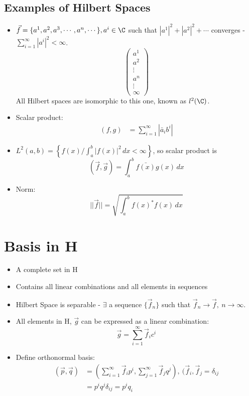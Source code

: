\documentclass[cplx.tex]{subfiles}
\begin{document}
\subsection{Examples of Hilbert Spaces}
\begin{itemize}
    \item $\vec{f} = \{a^1,a^2,a^3,\cdots,a^n,\cdots\}, a^i\in\C$ such that
        $|a^1|^2 + |a^2|^2 + \cdots$ converges - $\sum_{i=1}^\infty |a^i|^2 < \infty$.
        \begin{equation}
            \begin{pmatrix} a^1 \\ a^2 \\ \vdots \\ a^n \\ \vdots \\ \infty \end{pmatrix}
        \end{equation}
        All Hilbert spaces are isomorphic to this one, known as $l^2(\C)$.
    \item Scalar product:
        \begin{align}
            (f,g) &= \sum_{i=1}^\infty |\bar{a}_ib^i|
        \end{align}
    \item $L^2(a,b) = \left\{f(x) / \int_a^b |f(x)|^2\,dx < \infty \right\}$, so scalar product is
        \begin{equation}
            (\vec{f},\vec{g}) = \int_a^b \bar{f(x)}g(x)\,dx
        \end{equation}
    \item Norm:
        \begin{equation}
            ||\vec{f}|| = \sqrt{\int_a^b f(x)^*f(x)\,dx}
        \end{equation}
\end{itemize}

\section{Basis in H}
\begin{itemize}
    \item A complete set in H 
    \item Contains all linear combinations and all elements in sequences
    \item Hilbert Space is separable - $\exists$ a sequence $\{\vec{f}_n\}$ such that $\vec{f}_n \to \vec{f},~n\to\infty$.
    \item All elements in H, $\vec{g}$ can be expressed as a linear combination:
        \begin{equation}
            \vec{g} = \sum_{i=1}^\infty \vec{f}_ic^i
        \end{equation}
    \item Define orthonormal basis:
        \begin{align}
            (\vec{p},\vec{q}) &= \left(\sum_{i=1}^\infty \vec{f}_ip^i,\sum_{j=1}^\infty \vec{f}_jq^j\right),~ (\vec{f}_i,\vec{f}_j = \delta_{ij} \\
                              &= p^iq^j\delta_{ij} = p^iq_i
        \end{align}
\end{itemize}
\end{document}
